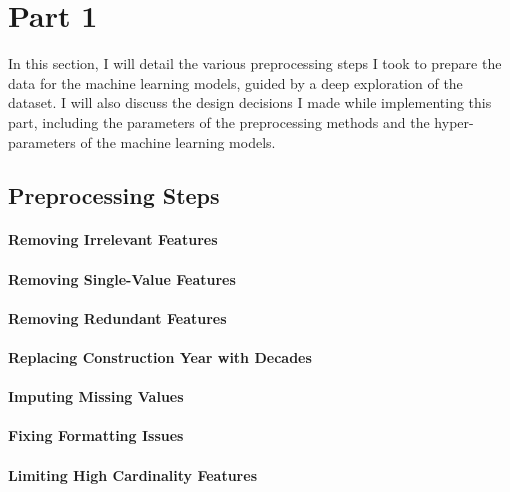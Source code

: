 \documentclass{article}
\begin{document}
\section{Part 1}
In this section, I will detail the various preprocessing steps I took to prepare the data for the machine learning models, guided by a deep exploration of the dataset. I will also discuss the design decisions I made while implementing this part, including the parameters of the preprocessing methods and the hyper-parameters of the machine learning models.

\subsection{Preprocessing Steps}

\paragraph{Removing Irrelevant Features}
\paragraph{Removing Single-Value Features}
\paragraph{Removing Redundant Features}
\paragraph{Replacing Construction Year with Decades}
\paragraph{Imputing Missing Values}
\paragraph{Fixing Formatting Issues}
\paragraph{Limiting High Cardinality Features}
\end{document}
